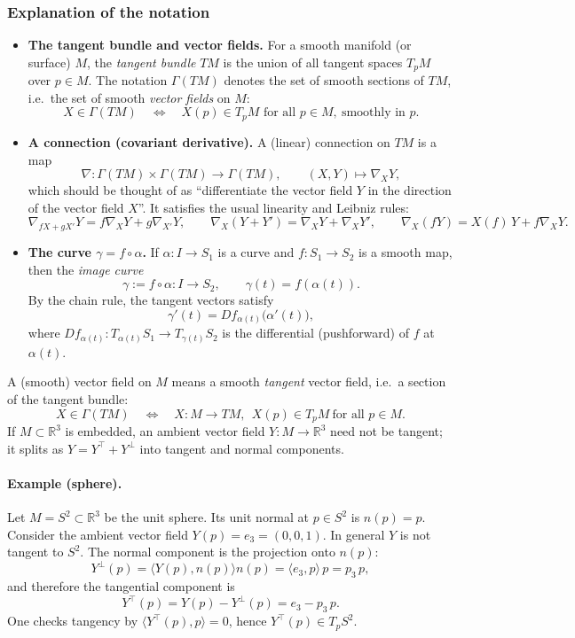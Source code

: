 \documentclass[12pt,a4paper]{article}
\theoremstyle{plain}
\theoremstyle{definition}      %
\begin{document}
	\subsubsection*{Explanation of the notation}
	
	\begin{itemize}
		\item \textbf{The tangent bundle and vector fields.}
		For a smooth manifold (or surface) $M$, the \emph{tangent bundle} $TM$ is the union of all tangent spaces
		$T_pM$ over $p\in M$.
		The notation $\Gamma(TM)$ denotes the set of smooth sections of $TM$, i.e.\ the set of smooth \emph{vector fields}
		on $M$:
		\[
		X\in\Gamma(TM)\quad\Longleftrightarrow\quad X(p)\in T_pM \text{ for all }p\in M,\ \text{smoothly in }p.
		\]
		
		\item \textbf{A connection (covariant derivative).}
		A (linear) connection on $TM$ is a map
		\[
		\nabla:\Gamma(TM)\times \Gamma(TM)\to \Gamma(TM),
		\qquad
		(X,Y)\mapsto \nabla_X Y,
		\]
		which should be thought of as ``differentiate the vector field $Y$ in the direction of the vector field $X$''.
		It satisfies the usual linearity and Leibniz rules:
		\[
		\nabla_{fX+gX'}Y=f\nabla_XY+g\nabla_{X'}Y,\qquad
		\nabla_X(Y+Y')=\nabla_XY+\nabla_XY',\qquad
		\nabla_X(fY)=X(f)\,Y+f\nabla_XY.
		\]
		
		\item \textbf{The curve $\gamma=f\circ\alpha$.}
		If $\alpha:I\to S_1$ is a curve and $f:S_1\to S_2$ is a smooth map, then the \emph{image curve}
		\[
		\gamma:=f\circ\alpha:I\to S_2,\qquad \gamma(t)=f(\alpha(t)).
		\]
		By the chain rule, the tangent vectors satisfy
		\[
		\gamma'(t)=Df_{\alpha(t)}\bigl(\alpha'(t)\bigr),
		\]
		where $Df_{\alpha(t)}:T_{\alpha(t)}S_1\to T_{\gamma(t)}S_2$ is the differential (pushforward) of $f$ at $\alpha(t)$.
	\end{itemize}
	
	A (smooth) vector field on $M$ means a smooth \emph{tangent} vector field, i.e.\ a section of the tangent bundle:
	\[
	X\in \Gamma(TM)\quad\Longleftrightarrow\quad X:M\to TM,\ \ X(p)\in T_pM\ \text{for all }p\in M.
	\]
	If $M\subset\mathbb{R}^3$ is embedded, an ambient vector field $Y:M\to\mathbb{R}^3$ need not be tangent; it splits as
	$Y=Y^\top+Y^\perp$ into tangent and normal components.
	
	\paragraph{Example (sphere).}
	Let $M=S^2\subset\mathbb{R}^3$ be the unit sphere. Its unit normal at $p\in S^2$ is $n(p)=p$.
	Consider the ambient vector field $Y(p)=e_3=(0,0,1)$.
	In general $Y$ is not tangent to $S^2$.
	The normal component is the projection onto $n(p)$:
	\[
	Y^\perp(p)=\langle Y(p),n(p)\rangle n(p)=\langle e_3,p\rangle\,p=p_3\,p,
	\]
	and therefore the tangential component is
	\[
	Y^\top(p)=Y(p)-Y^\perp(p)=e_3-p_3\,p.
	\]
	One checks tangency by $\langle Y^\top(p),p\rangle=0$, hence $Y^\top(p)\in T_pS^2$.
	
\end{document}
